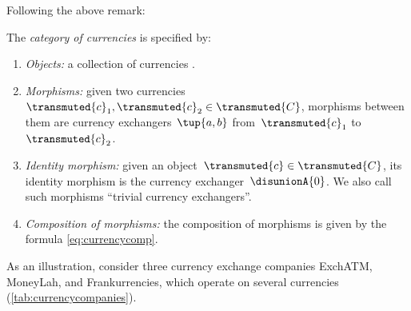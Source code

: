 Following the above remark:

\begin{definition}
  \label{def:Curr}
  The \emph{category of currencies} \Curr is specified by:
  \begin{enumerate}
    \item \emph{Objects:} a collection of currencies .
    \item \emph{Morphisms:} given two currencies~$\transmuted{c}_1, \transmuted{c}_2\in \transmuted{C}$, morphisms between them are currency exchangers~$\tup{a,b}$ from~$\transmuted{c}_1$ to~$\transmuted{c}_2$.
    \item \emph{Identity morphism:} given an object~$\transmuted{c} \in \transmuted{C}$, its identity morphism is the currency exchanger~$\disunionA{0}$. We also call such morphisms ``trivial currency exchangers''.
    \item \emph{Composition of morphisms:} the composition of morphisms is given by the formula \cref{eq:currencycomp}.
  \end{enumerate}
\end{definition}

As an illustration, consider three currency exchange companies ExchATM, MoneyLah, and Frankurrencies, which operate on several currencies (\cref{tab:currencycompanies}).

